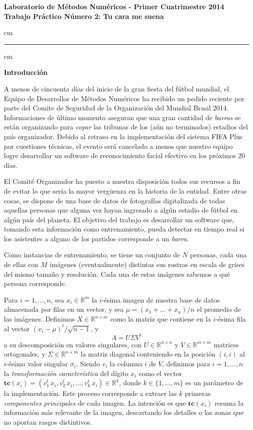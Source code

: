 \documentclass[11pt, a4paper]{article}
\newcommand{\real}{\mathbb{R}}
\begin{document}
\begin{centering}
\large\bf Laboratorio de M\'etodos Num\'ericos - Primer Cuatrimestre 2014 \\
\large\bf Trabajo Pr\'actico N\'umero 2: Tu cara me suena\\
\end{centering}


 cm
\hrule
{} cm

{\bf\noindent Introducci\'on}

A menos de cincuenta d\'ias del inicio de la gran fiesta del f\'utbol mundial, el Equipo de Desarrollos de M\'etodos
Num\'ericos ha recibido un pedido reciente por parte del Comite de Seguridad de la
Organizaci\'on del Mundial Brasil 2014. Informaciones de \'ultimo momento aseguran que una gran cantidad de
\emph{barras} se est\'an organizando para \emph{copar} las tribunas de los (a\'un no terminados) estadios del pa\'is
organizador. Debido al retraso en la implementaci\'on del sistema FIFA Plus por cuestiones t\'ecnicas, el evento ser\'a
cancelado a menos que nuestro equipo logre desarrollar un software de reconocimiento facial efectivo en los pr\'oximos
20 d\'ias.

El Comit\'e Organizador ha puesto a nuestra disposici\'on todos sus recursos a fin de evitar lo que ser\'ia la mayor verg\"uenza
en la historia de la entidad. Entre otras cosas, se dispone de una base de datos de fotograf\'ias digitalizada de todas
aquellas personas que alguna vez hayan ingresado a alg\'un estadio de f\'utbol en alg\'un pa\'is del planeta. El
objetivo del trabajo es desarrollar un software que, tomando esta informaci\'on como entrenamiento, pueda detectar en
tiempo real si los asistentes a alguno de los partidos corresponde a un \emph{barra}.


Como instancias de entrenamiento, se tiene un conjunto de $N$ personas, cada una de ellas con $M$ im\'agenes
(eventualmente) distintas sus rostros en escala de grises del mismo tama\~no y resoluci\'on. Cada una de estas
im\'agenes sabemos a qu\'e persona corresponde.

Para $i = 1,\ldots, n$, sea $x_i \in \real^{m}$ la $i$-\'esima imagen de nuestra base de datos almacenada por filas en
un vector, y sea $\mu = (x_1 + \ldots + x_n)/n$ el promedio de las im\'agenes. Definimos $X\in\real^{n\times m}$ como la
matriz que contiene en la $i$-\'esima fila al vector $(x_i - \mu)^{t}/\sqrt{n-1}$, y $$A=U \Sigma V^t$$ a su descomposici\'on en valores singulares, con $U\in\real^{n\times n}$ y $V\in\real^{m\times m}$ matrices ortogonales, y $\Sigma\in\real^{n\times m}$ la matriz diagonal conteniendo en la posici\'on $(i,i)$ al $i$-\'esimo valor singular $\sigma_i$.
Siendo $v_i$ la columna $i$ de $V$, definimos para $i = 1,\ldots,n$ la \textsl{transformaci\'on caracter\'istica} del d\'igito $x_{i}$ como el vector $\mathbf{tc}(x_i) = (v_1^t\, x_i, v_2^t\, x_i,\ldots,v_k^t\, x_i) \in\real^k$, donde $k \in\{1,\ldots,m\}$ es un par\'ametro de la implementaci\'on. Este proceso corresponde a extraer las $k$ primeras \textit{componentes principales} de cada imagen. La intenci\'on es que $\mathbf{tc}(x_i)$ resuma la informaci\'on m\'as relevante de la imagen, descartando los detalles o las zonas que no aportan rasgos distintivos.
\end{document}
